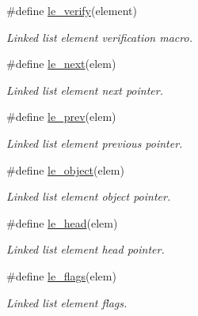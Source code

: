 \begin{CompactItemize}
\#define \hyperlink{group__dbprim__link_a20}{le\_\-verify}(element)
\begin{CompactList}\small\item\em Linked list element verification macro. \item\end{CompactList}\item 
\#define \hyperlink{group__dbprim__link_a21}{le\_\-next}(elem)
\begin{CompactList}\small\item\em Linked list element next pointer. \item\end{CompactList}\item 
\#define \hyperlink{group__dbprim__link_a22}{le\_\-prev}(elem)
\begin{CompactList}\small\item\em Linked list element previous pointer. \item\end{CompactList}\item 
\#define \hyperlink{group__dbprim__link_a23}{le\_\-object}(elem)
\begin{CompactList}\small\item\em Linked list element object pointer. \item\end{CompactList}\item 
\#define \hyperlink{group__dbprim__link_a24}{le\_\-head}(elem)
\begin{CompactList}\small\item\em Linked list element head pointer. \item\end{CompactList}\item 
\#define \hyperlink{group__dbprim__link_a25}{le\_\-flags}(elem)
\begin{CompactList}\small\item\em Linked list element flags. \item\end{CompactList}\end{CompactItemize}

